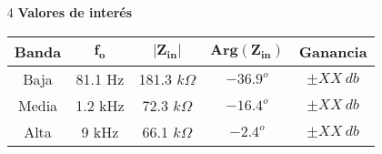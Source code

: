 \begin{multicols}{2}
\begin{enumerate}
	\item[4] \textbf{Valores de interés}
	\begin{table}[H]
		\begin{tabular}{ccccc}
			\hline			
			\textbf{Banda} & $\mathbf{f_o}$ & $\mathbf{|Z_{in}|}$ & $\mathbf{Arg\left(Z_{in}\right)}$ & \textbf{Ganancia} \\
			\hline
			Baja           & 81.1 Hz                     & 181.3 $k\Omega$     & $-36.9^o$                           & $\pm XX \ db$          \\
			Media          & 1.2 kHz                     & 72.3 $k\Omega$      & $-16.4^o$                           & $\pm XX \ db$          \\
			Alta           & 9 kHz                       & 66.1 $k\Omega$      & $-2.4^o$                            & $\pm XX \ db$         	\\
			\hline
		\end{tabular}
	\end{table}

\end{enumerate}
\end{multicols}

%	
%		

